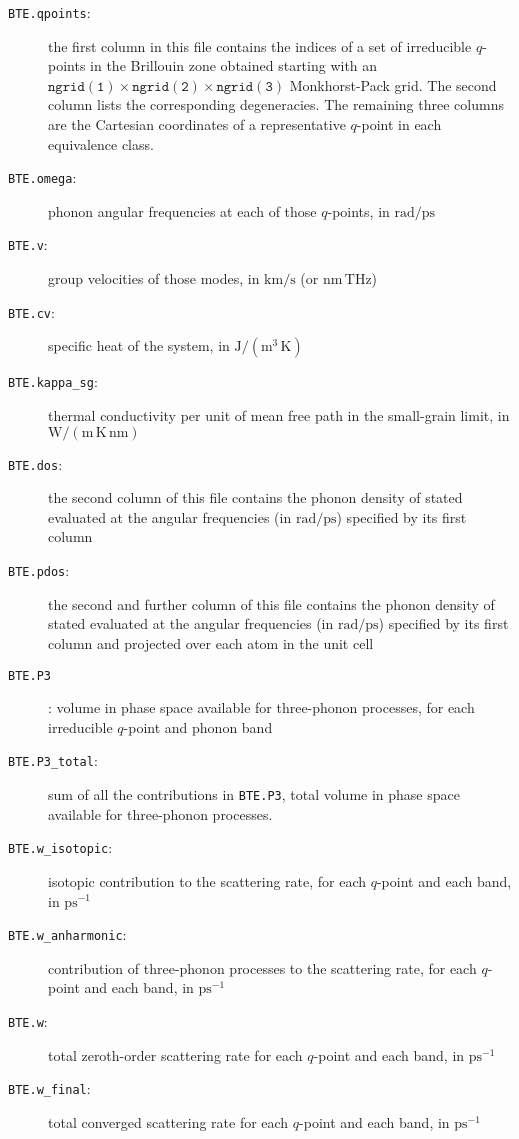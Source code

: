 \documentclass[a4paper,10pt,english]{article}
\begin{document}
\begin{description}
\item[\texttt{BTE.qpoints}:] the first column in this file contains the indices of a set of irreducible $q$-points in the Brillouin zone obtained starting with an $\mathtt{ngrid\left(1\right)}\times\mathtt{ngrid\left(2\right)}\times\mathtt{ngrid\left(3\right)}$ Monkhorst-Pack grid. The second column lists the corresponding degeneracies. The remaining three columns are the Cartesian coordinates of a representative $q$-point in each equivalence class.
\item[\texttt{BTE.omega}:] phonon angular frequencies at each of those $q$-points, in $\mathrm{rad/ps}$
\item[\texttt{BTE.v}:] group velocities of those modes, in $\mathrm{km/s}$ (or $\mathrm{nm}\,\mathrm{THz}$)
\item[\texttt{BTE.cv}:] specific heat of the system, in $\mathrm{J/\left(m^3\,K\right)}$
\item[\texttt{BTE.kappa\_sg}:] thermal conductivity per unit of mean free path in the small-grain limit, in $\mathrm{W/\left(m\,K\,nm\right)}$
\item[\texttt{BTE.dos}:] the second column of this file contains the phonon density of stated evaluated at the angular frequencies (in $\mathrm{rad/ps}$) specified by its first column
\item[\texttt{BTE.pdos}:] the second and further column of this file contains the phonon density of stated evaluated at the angular frequencies (in $\mathrm{rad/ps}$) specified by its first column and projected over each atom in the unit cell
\item[\texttt{BTE.P3}]: volume in phase space available for three-phonon processes, for each irreducible $q$-point and phonon band
\item[\texttt{BTE.P3\_total}:] sum of all the contributions in \texttt{BTE.P3}, total volume in phase space available for three-phonon processes.
\item[\texttt{BTE.w\_isotopic}:] isotopic contribution to the scattering rate, for each $q$-point and each band, in $\mathrm{ps^{-1}}$
\item[\texttt{BTE.w\_anharmonic}:] contribution of three-phonon processes to the scattering rate, for each $q$-point and each band, in $\mathrm{ps^{-1}}$
\item[\texttt{BTE.w}:] total zeroth-order scattering rate for each $q$-point and each band, in $\mathrm{ps^{-1}}$
\item[\texttt{BTE.w\_final}:] total converged scattering rate for each $q$-point and each band, in $\mathrm{ps^{-1}}$

\end{description}
\end{document}
